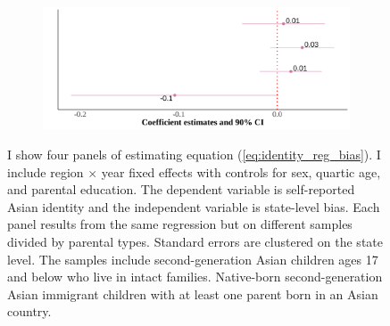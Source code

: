 \begin{center}
\begin{figure}[!htb]
\begin{subfigure}{.48\textwidth}
\centering
\includegraphics[width=.9\linewidth]{by-parents-regs-wh.png}
\end{subfigure}
\caption*{\footnotesize{I show four panels of estimating equation (\ref{eq:identity_reg_bias}). I include region $\times$ year fixed effects with controls for sex, quartic age, and parental education. The dependent variable is self-reported Asian identity and the independent variable is state-level bias. Each panel results from the same regression but on different samples divided by parental types. Standard errors are clustered on the state level. The samples include second-generation Asian children ages 17 and below who live in intact families. Native-born second-generation Asian immigrant children with at least one parent born in an Asian country.}}
\end{figure}
\end{center}

\pagebreak
\newpage

